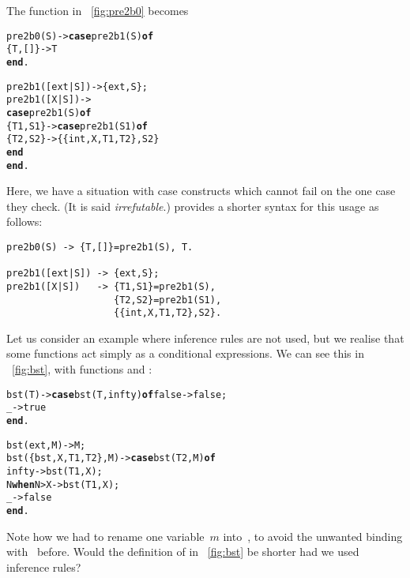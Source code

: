 The function in \fig~\vref{fig:pre2b0} becomes
\begin{alltt}
pre2b0(S) -> \textbf{case} pre2b1(S) \textbf{of}
               \{T,[]\} -> T
             \textbf{end}.

pre2b1([ext|S]) -> \{ext,S\};
pre2b1([X|S])   ->
  \textbf{case} pre2b1(S) \textbf{of}
    \{T1,S1\} -> \textbf{case} pre2b1(S1) \textbf{of}
                 \{T2,S2\} -> \{\{int,X,T1,T2\},S2\}
               \textbf{end}
  \textbf{end}.
\end{alltt}
Here, we have a situation with case constructs which cannot fail on
the one case they check. (It is said \emph{irrefutable}.) \Erlang
provides a shorter syntax for this usage as follows:
\begin{verbatim}
pre2b0(S) -> {T,[]}=pre2b1(S), T.

pre2b1([ext|S]) -> {ext,S};
pre2b1([X|S])   -> {T1,S1}=pre2b1(S),
                   {T2,S2}=pre2b1(S1),
                   {{int,X,T1,T2},S2}.
\end{verbatim}
Let us consider an example where inference rules are not used, but we
realise that some functions act simply as a conditional expressions. We
can see this in \fig~\vref{fig:bst}, with functions  and
:
\begin{alltt}
bst(T) -> \textbf{case} bst(T,infty) \textbf{of} false -> false;
                                   \_ -> true
          \textbf{end}.

bst(ext,M)           -> M;
bst(\{bst,X,T1,T2\},M) -> \textbf{case} bst(T2,M) \textbf{of}
                                 infty -> bst(T1,X);
                          N \textbf{when} N > X -> bst(T1,X);
                                     \_ -> false
                        \textbf{end}.
\end{alltt}
Note how we had to rename one variable~\(m\) into~, to
avoid the unwanted binding with~ before. Would the
definition of  in \fig~\ref{fig:bst} be shorter had we used
inference rules?


